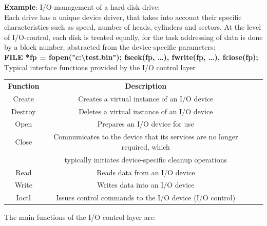 \textbf{Example}: I/O-management of a hard disk drive:\\

Each drive has a unique device driver, that takes into account their specific characteristics such as speed, number of heads, cylinders and sectors. At the level of I/O-control, each disk is treated equally, for the task addressing of data is done by a block number, abstracted from the device-specific parameters: \\

\textbf{FILE *fp =  fopen("c:{\textbackslash}test.bin"); fseek(fp, {\dots}), fwrite(fp, {\dots}), fclose(fp);}\\

Typical interface functions provided by the\textbf{ }I/O control layer

\begin{table}[h!]
\setlength{\tabcolsep}{10pt} %
\renewcommand{\arraystretch}{1.5} %
\centering
 \begin{tabular}{|c|c|c|c|} \hline
 \textbf{Function} & \textbf{Description} \\ [0.1ex] 
Create & Creates a virtual instance of an I/O device \\ \hline 
Destroy & Deletes a virtual instance of an I/O device \\ \hline 
Open & Prepares an I/O device for use \\ \hline 
Close & Communicates to the device that its services are no longer required, which \\ & typically initiates  device-specific cleanup operations \\ \hline 
Read & Reads data from an I/O device \\ \hline 
Write & Writes data into an I/O device \\ \hline 
Ioctl & Issues control commands to the I/O device (I/O control) \\ \hline 
 \end{tabular}
\end{table}

The main functions of the I/O control layer are:

